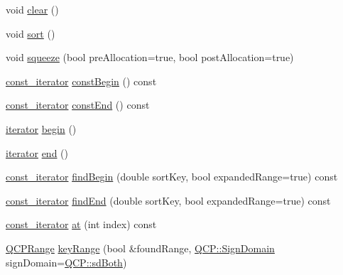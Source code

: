 \begin{DoxyCompactItemize}
\item 
void \hyperlink{class_q_c_p_data_container_a7e2b29736c6fd761649bda1a54ba967f}{clear} ()
\item 
void \hyperlink{class_q_c_p_data_container_a75da92e33063b63d6da5014683591d45}{sort} ()
\item 
void \hyperlink{class_q_c_p_data_container_a82fcc511def22287fc62579d0706387c}{squeeze} (bool pre\+Allocation=true, bool post\+Allocation=true)
\item 
\hyperlink{class_q_c_p_data_container_ae40a91f5cb0bcac61d727427449b7d15}{const\+\_\+iterator} \hyperlink{class_q_c_p_data_container_a02360beeb3484df7c20f20c8f3ed4bb2}{const\+Begin} () const 
\item 
\hyperlink{class_q_c_p_data_container_ae40a91f5cb0bcac61d727427449b7d15}{const\+\_\+iterator} \hyperlink{class_q_c_p_data_container_ad007d9955a4fb2ec1f7e07532b59d169}{const\+End} () const 
\item 
\hyperlink{class_q_c_p_data_container_a1bb453c3ae37d1ee5268878acb3a9d29}{iterator} \hyperlink{class_q_c_p_data_container_a80032518413ab8f418f7c81182fd06cb}{begin} ()
\item 
\hyperlink{class_q_c_p_data_container_a1bb453c3ae37d1ee5268878acb3a9d29}{iterator} \hyperlink{class_q_c_p_data_container_acf66dfad83fe041380f5e0491e7676f2}{end} ()
\item 
\hyperlink{class_q_c_p_data_container_ae40a91f5cb0bcac61d727427449b7d15}{const\+\_\+iterator} \hyperlink{class_q_c_p_data_container_a8ffcab551fd06dd037874ef644c73467}{find\+Begin} (double sort\+Key, bool expanded\+Range=true) const 
\item 
\hyperlink{class_q_c_p_data_container_ae40a91f5cb0bcac61d727427449b7d15}{const\+\_\+iterator} \hyperlink{class_q_c_p_data_container_ad9b6b0343252eb3bbd591ee28aaa4e9d}{find\+End} (double sort\+Key, bool expanded\+Range=true) const 
\item 
\hyperlink{class_q_c_p_data_container_ae40a91f5cb0bcac61d727427449b7d15}{const\+\_\+iterator} \hyperlink{class_q_c_p_data_container_a6e92717af67e5e93a80f1f44ce040c74}{at} (int index) const 
\item 
\hyperlink{class_q_c_p_range}{Q\+C\+P\+Range} \hyperlink{class_q_c_p_data_container_aba6e1a93c21ccc56a432b4a02c9d0ed2}{key\+Range} (bool \&found\+Range, \hyperlink{namespace_q_c_p_afd50e7cf431af385614987d8553ff8a9}{Q\+C\+P\+::\+Sign\+Domain} sign\+Domain=\hyperlink{namespace_q_c_p_afd50e7cf431af385614987d8553ff8a9aa38352ef02d51ddfa4399d9551566e24}{Q\+C\+P\+::sd\+Both})
\item 

\end{DoxyCompactItemize}
